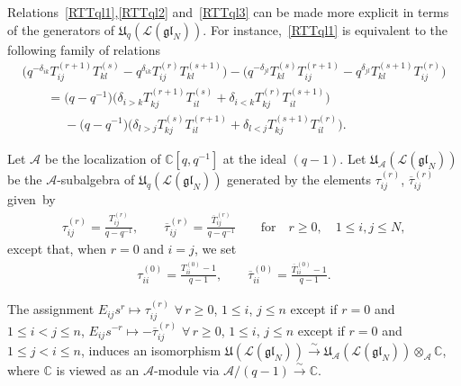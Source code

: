 \documentclass[pdftex]{sigma}
\numberwithin{theorem}{section}
\numberwithin{proposition}{section}
\numberwithin{lemma}{section}
\numberwithin{corollary}{section}
\numberwithin{definition}{section}
\numberwithin{example}{section}
\numberwithin{remark}{section}
\numberwithin{note}{section}
\numberwithin{equation}{section}
\begin{document}
Relations~\eqref{RTTql1},\eqref{RTTql2} and~\eqref{RTTql3} can be made more explicit in terms of the generators of
$\mathfrak{U}_q(\mathcal{L}(\mathfrak{gl}_N))$.
For instance,~\eqref{RTTql1} is equivalent to the following family of relations
\begin{gather}
\big(q^{-\delta_{ik}} T_{ij}^{(r+1)} T_{kl}^{(s)} - q^{\delta_{ik}}T_{ij}^{(r)} T_{kl}^{(s+1)}\big) - \big(q^{-\delta_{jl}}
T_{kl}^{(s)} T_{ij}^{(r+1)} - q^{\delta_{jl}} T_{kl}^{(s+1)} T_{ij}^{(r)}\big)
\nonumber
\\
\qquad{}
= \big(q-q^{-1}\big) \big(\delta_{i>k} T_{kj}^{(r+1)} T_{il}^{(s)} + \delta_{i<k} T_{kj}^{(r)} T_{il}^{(s+1)}\big)
\nonumber\\
\qquad\phantom{=}
- \big(q-q^{-1}\big)\big(\delta_{l>j} T_{kj}^{(s)} T_{il}^{(r+1)} + \delta_{l<j} T_{kj}^{(s+1)} T_{il}^{(r)}\big).
\label{RTTql12}
\end{gather}

Let $\mathcal{A}$ be the localization of $\mathbb{C}[q,q^{-1}]$ at the ideal $(q-1)$.
Let $\mathfrak{U}_{\mathcal{A}}(\mathcal{L}(\mathfrak{gl}_N))$ be the $\mathcal{A}$-subalgebra of
$\mathfrak{U}_q(\mathcal{L}(\mathfrak{gl}_N))$ generated by the elements $ \tau_{ij}^{(r)}$,
$\overline{\tau}_{ij}^{(r)}$ given~by
\begin{gather*}
\tau_{ij}^{(r)} = \frac{T_{ij}^{(r)}}{q-q^{-1}},
\qquad
\overline{\tau}_{ij}^{(r)} = \frac{\overline{T}_{ij}^{(r)}}{q-q^{-1}}
\qquad\text{for}\quad r\ge 0,\quad 1\le i,j \le N,
\end{gather*}
except that, when $r=0$ and $i=j$, we set
\begin{gather*}
\tau_{ii}^{(0)} = \frac{T_{ii}^{(0)}-1}{q-1}, \qquad \overline{\tau}_{ii}^{(0)} = \frac{\overline{T}_{ii}^{(0)}-1}{q-1}.
\end{gather*}

\begin{theorem}
\label{qlim}
The assignment $E_{ij} s^r \mapsto \tau_{ij}^{(r)}$ $\forall\, r\ge 0$, $1\le i$, $j\le n$ except if $r=0$ and $1\le i<j\le n$,
$E_{ij} s^{-r} \mapsto -\overline{\tau}_{ij}^{(r)}$ $\forall\, r\ge 0$, $1\le i$, $j\le n$ except if $r=0$ and $1\le j<i\le n$,
induces an isomorphism $\mathfrak{U}(\mathcal{L}(\mathfrak{gl}_N)) \stackrel{\sim}{\longrightarrow}
\mathfrak{U}_{\mathcal{A}}(\mathcal{L}(\mathfrak{gl}_N)) \otimes_{\mathcal{A}} \mathbb{C}$, where $\mathbb{C}$
is viewed as an $\mathcal{A}$-module via $\mathcal{A}/(q-1) \stackrel{\sim}{\longrightarrow} \mathbb{C}$.
\end{theorem}
\end{document}
